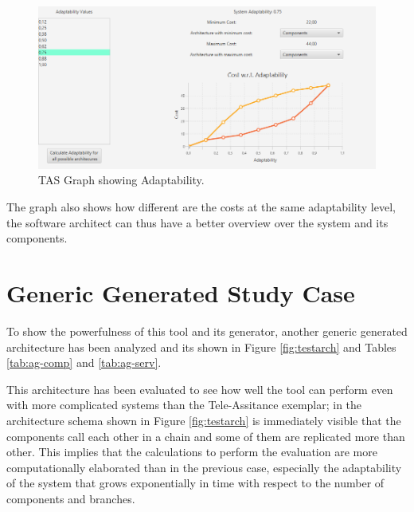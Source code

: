 \begin{figure}[ht]
	\centerline
	{\includegraphics[scale=0.55]{img/tas-adapt.png}}
	\caption[TAS Graph showing Adaptability]{TAS Graph showing Adaptability.}
	\label{fig:tas-adapt}
\end{figure}

The graph also shows how different are the costs at the same adaptability level, the software architect can thus have a better overview over the system and its components.
\clearpage

\section{Generic Generated Study Case}
To show the powerfulness of this tool and its generator, another generic generated architecture has been analyzed and its shown in Figure \ref{fig:testarch} and Tables \ref{tab:ag-comp} and \ref{tab:ag-serv}. 

This architecture has been evaluated to see how well the tool can perform even with more complicated systems than the Tele-Assitance exemplar; in the architecture schema shown in Figure \ref{fig:testarch} is immediately visible that the components call each other in a chain and some of them are replicated more than other. This implies that the calculations to perform the evaluation are more computationally elaborated than in the previous case, especially the adaptability of the system that grows exponentially in time with respect to the number of components and branches.

